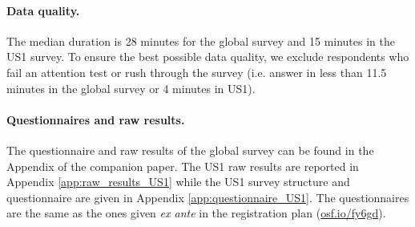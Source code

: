 \begin{small}
\paragraph{\small Data quality.} %
The median duration is 28 minutes for the global survey and 15 minutes in the US1 survey. To ensure the best possible data quality, we exclude respondents who fail an attention test or rush through the survey (i.e. answer in less than 11.5 minutes in the global survey or 4 minutes in US1). 

\paragraph{\small Questionnaires and raw results.} %
The questionnaire and raw results of the global survey can be found in the Appendix of the companion paper.\cite{dechezlepretre_fighting_2022} The US1 raw results are reported in Appendix \ref{app:raw_results_US1} while the US1 survey structure and questionnaire are given in Appendix \ref{app:questionnaire_US1}. The questionnaires are the same as the ones given \textit{ex ante} in the registration plan (\href{https://osf.io/fy6gd}{osf.io/fy6gd}).


\end{small}
